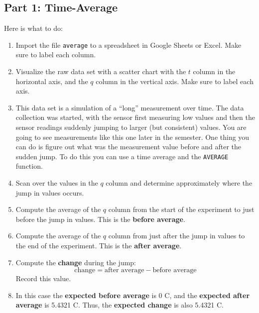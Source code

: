 \subsection{Part 1: Time-Average}
%
Here is what to do:
\begin{enumerate}
    \item Import the file \texttt{average} to a spreadsheet in Google Sheets or Excel. Make sure to label each column.
    \item Visualize the raw data set with a scatter chart with the $t$ column in the horizontal axis, and the $q$ column in the vertical axis. Make sure to label each axis.
    \item This data set is a simulation of a ``long'' measurement over time. The data collection was started, with the sensor first measuring low values and then the sensor readings suddenly jumping to larger (but consistent) values. You are going to see measurements like this one later in the semester. One thing you can do is figure out what was the measurement value before and after the sudden jump. To do this you can use a time average and the \texttt{AVERAGE} function.
    \item Scan over the values in the $q$ column and determine approximately where the jump in values occurs.
    \item Compute the average of the $q$ column from the start of the experiment to just before the jump in values. This is the \textbf{before average}.
    \item Compute the average of the $q$ column from just after the jump in values to the end of the experiment. This is the \textbf{after average}.
    \item Compute the \textbf{change} during the jump:
    \begin{equation}
        \text{change} = \text{after average} - \text{before average}
    \end{equation}
    Record this value.
    \item In this case the \textbf{expected before average} is 0 C, and the \textbf{expected after average} is 5.4321 C. Thus, the \textbf{expected change} is also 5.4321 C.
\end{enumerate}
%
